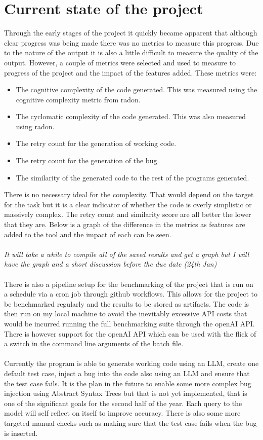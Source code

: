 \documentclass[12pt]{extarticle}
\begin{document}
\section{Current state of the project}

Through the early stages of the project it quickly became apparent that although clear progress was being made there was no metrics to measure this progress. Due to the nature of the output it is also a little difficult to measure the quality of the output. However, a couple of metrics were selected and used to measure to progress of the project and the impact of the features added. These metrics were:
\begin{itemize}
    \item The cognitive complexity of the code generated. This was measured using the cognitive complexity metric from radon.
    \item The cyclomatic complexity of the code generated. This was also measured using radon.
    \item The retry count for the generation of working code.
    \item The retry count for the generation of the bug.
    \item The similarity of the generated code to the rest of the programs generated.
\end{itemize}
There is no necessary ideal for the complexity. That would depend on the target for the task but it is a clear indicator of whether the code is overly simplistic or massively complex. The retry count and similarity score are all better the lower that they are. Below is a graph of the difference in the metrics as features are added to the tool and the impact of each can be seen.\\
\\
\textit{It will take a while to compile all of the saved results and get a graph but I will have the graph and a short discussion before the due date (24th Jan)}\\
\\
There is also a pipeline setup for the benchmarking of the project that is run on a schedule via a cron job through github workflows. This allows for the project to be benchmarked regularly and the results to be stored as artifacts. The code is then run on my local machine to avoid the inevitably excessive API costs that would be incurred running the full benchmarking suite through the openAI API. There is however support for the openAI API which can be used with the flick of a switch in the command line arguments of the batch file.\\
\\
Currently the program is able to generate working code using an LLM, create one default test case, inject a bug into the code also using an LLM and ensure that the test case fails. It is the plan in the future to enable some more complex bug injection using Abstract Syntax Trees but that is not yet implemented, that is one of the significant goals for the second half of the year. Each query to the model will self reflect on itself to improve accuracy. There is also some more targeted manual checks such as making sure that the test case fails when the bug is inserted.
\end{document}

